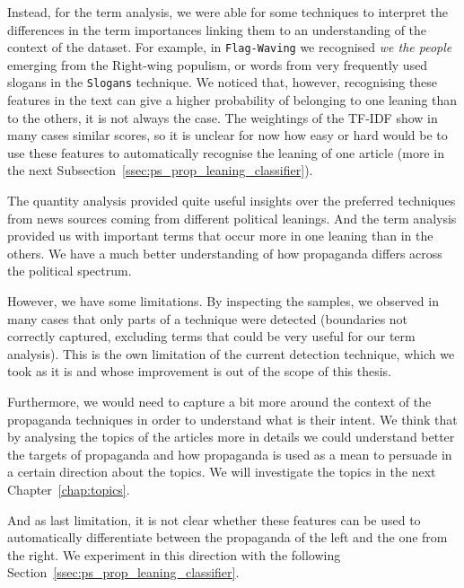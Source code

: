 Instead, for the term analysis, we were able for some techniques to interpret the differences in the term importances linking them to an understanding of the context of the dataset. For example, in \texttt{Flag-Waving} we recognised \textit{we the people} emerging from the Right-wing populism, or words from very frequently used slogans in the \texttt{Slogans} technique.
We noticed that, however, recognising these features in the text can give a higher probability of belonging to one leaning than to the others, it is not always the case. The weightings of the TF-IDF show in many cases similar scores, so it is unclear for now how easy or hard would be to use these features to automatically recognise the leaning of one article (more in the next Subsection~\ref{ssec:ps_prop_leaning_classifier}).

The quantity analysis provided quite useful insights over the preferred techniques from news sources coming from different political leanings. And the term analysis provided us with important terms that occur more in one leaning than in the others.
We have a much better understanding of how propaganda differs across the political spectrum.

However, we have some limitations. By inspecting the samples, we observed in many cases that only parts of a technique were detected (boundaries not correctly captured, excluding terms that could be very useful for our term analysis).
This is the own limitation of the current detection technique, which we took as it is and whose improvement is out of the scope of this thesis.

Furthermore, we would need to capture a bit more around the context of the propaganda techniques in order to understand what is their intent. We think that by analysing the topics of the articles more in details we could understand better the targets of propaganda and how propaganda is used as a mean to persuade in a certain direction about the topics. We will investigate the topics in the next Chapter~\ref{chap:topics}.

And as last limitation, it is not clear whether these features can be used to automatically differentiate between the propaganda of the left and the one from the right. We experiment in this direction with the following Section~\ref{ssec:ps_prop_leaning_classifier}.


